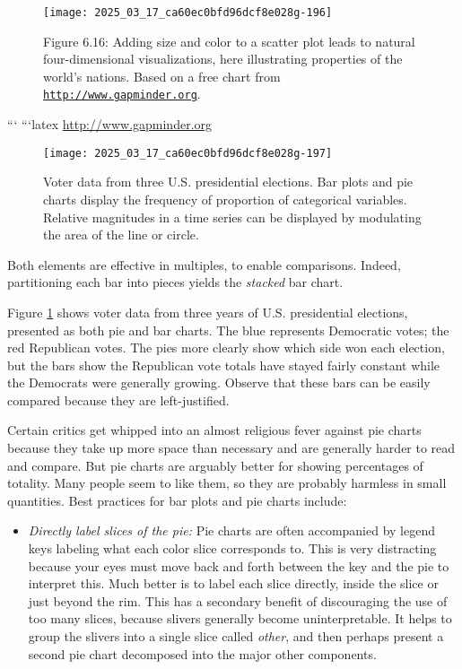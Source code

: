 \documentclass[10pt]{article}
\begin{document}
\begin{figure}[h!]
\centering
\texttt{[image: 2025\_03\_17\_ca60ec0bfd96dcf8e028g-196]}
\caption{Figure 6.16: Adding size and color to a scatter plot leads to natural four-dimensional visualizations, here illustrating properties of the world's nations. Based on a free chart from \href{http://www.gapminder.org}{\nolinkurl{http://www.gapminder.org}}.}
\end{figure}
```
```latex
\href{http://www.gapminder.org}{http://www.gapminder.org}
\begin{figure}[H]
    \centering
    \texttt{[image: 2025\_03\_17\_ca60ec0bfd96dcf8e028g-197]}
    \caption{Voter data from three U.S. presidential elections. Bar plots and pie charts display the frequency of proportion of categorical variables. Relative magnitudes in a time series can be displayed by modulating the area of the line or circle.}
    \label{fig:voter-data}
\end{figure}

Both elements are effective in multiples, to enable comparisons. Indeed, partitioning each bar into pieces yields the \textit{stacked} bar chart.

Figure \ref{fig:voter-data} shows voter data from three years of U.S. presidential elections, presented as both pie and bar charts. The blue represents Democratic votes; the red Republican votes. The pies more clearly show which side won each election, but the bars show the Republican vote totals have stayed fairly constant while the Democrats were generally growing. Observe that these bars can be easily compared because they are left-justified.

Certain critics get whipped into an almost religious fever against pie charts because they take up more space than necessary and are generally harder to read and compare. But pie charts are arguably better for showing percentages of totality. Many people seem to like them, so they are probably harmless in small quantities. Best practices for bar plots and pie charts include:

\begin{itemize}
    \item \textit{Directly label slices of the pie:} Pie charts are often accompanied by legend keys labeling what each color slice corresponds to. This is very distracting because your eyes must move back and forth between the key and the pie to interpret this. Much better is to label each slice directly, inside the slice or just beyond the rim. This has a secondary benefit of discouraging the use of too many slices, because slivers generally become uninterpretable. It helps to group the slivers into a single slice called \textit{other}, and then perhaps present a second pie chart decomposed into the major other components.
\end{itemize}
\end{document}
